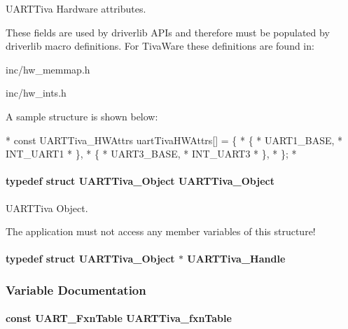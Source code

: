 U\-A\-R\-T\-Tiva Hardware attributes. 

These fields are used by driverlib A\-P\-Is and therefore must be populated by driverlib macro definitions. For Tiva\-Ware these definitions are found in\-:
\begin{DoxyItemize}
\item inc/hw\-\_\-memmap.\-h
\item inc/hw\-\_\-ints.\-h
\end{DoxyItemize}

A sample structure is shown below\-: 
\begin{DoxyCode}
*  \textcolor{keyword}{const} UARTTiva_HWAttrs uartTivaHWAttrs[] = \{
*      \{
*          UART1\_BASE,
*          INT\_UART1
*      \},
*      \{
*          UART3\_BASE,
*          INT\_UART3
*      \},
*  \};
*  
\end{DoxyCode}
\paragraph[{U\-A\-R\-T\-Tiva\-\_\-\-Object}]{\setlength{\rightskip}{0pt plus 5cm}typedef struct {\bf U\-A\-R\-T\-Tiva\-\_\-\-Object}  {\bf U\-A\-R\-T\-Tiva\-\_\-\-Object}}\label{_u_a_r_t_tiva_8h_a415fb8fc7172a69540bef335b0ba6735}


U\-A\-R\-T\-Tiva Object. 

The application must not access any member variables of this structure! 
\paragraph[{U\-A\-R\-T\-Tiva\-\_\-\-Handle}]{\setlength{\rightskip}{0pt plus 5cm}typedef struct {\bf U\-A\-R\-T\-Tiva\-\_\-\-Object} $\ast$ {\bf U\-A\-R\-T\-Tiva\-\_\-\-Handle}}\label{_u_a_r_t_tiva_8h_aaeecfa764f24fc2f566ca149dc091e78}


\subsubsection{Variable Documentation}
\paragraph[{U\-A\-R\-T\-Tiva\-\_\-fxn\-Table}]{\setlength{\rightskip}{0pt plus 5cm}const {\bf U\-A\-R\-T\-\_\-\-Fxn\-Table} U\-A\-R\-T\-Tiva\-\_\-fxn\-Table}\label{_u_a_r_t_tiva_8h_a4b0dd67d0f6e16ffba1aa4ba8cf1db6f}
